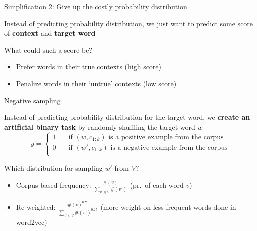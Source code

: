\documentclass[12pt,aspectratio=169,handout]{beamer}
\begin{document}
\begin{frame}{Simplification 2: Give up the costly probability distribution}

Instead of predicting probability distribution, we just want to predict some score of \textbf{context} and \textbf{target word}

What could such a score be?

\pause

\begin{itemize}
	\item Prefer words in their true contexts (high score)
	\pause
	\item Penalize words in their `untrue' contexts (low score)
\end{itemize}

\end{frame}


\begin{frame}{Negative sampling}
	
Instead of predicting probability distribution for the target word, we \textbf{create an artificial binary task} by randomly shuffling the target word $w$ \pause
$$
y = 
 \begin{cases}
	1  & \quad \text{if } (w, c_{1:k}) \text{ is a positive example from the corpus}\\
	0  & \quad \text{if } (w', c_{1:k}) \text{ is a negative example from the corpus}\\
\end{cases}
$$

\pause
Which distribution for sampling $w'$ from $V$?
\begin{itemize}
	\item Corpus-based frequency: $\frac{\#(v)}{\sum_{v' \in V} \#(v')}$ (pr.\ of each word $v$)
	\item Re-weighted: $\frac{\#(v)^{0.75}}{\sum_{v' \in V} \#(v')^{0.75}}$ (more weight on less frequent words done in word2vec)
\end{itemize}
	
\end{frame}
\end{document}
